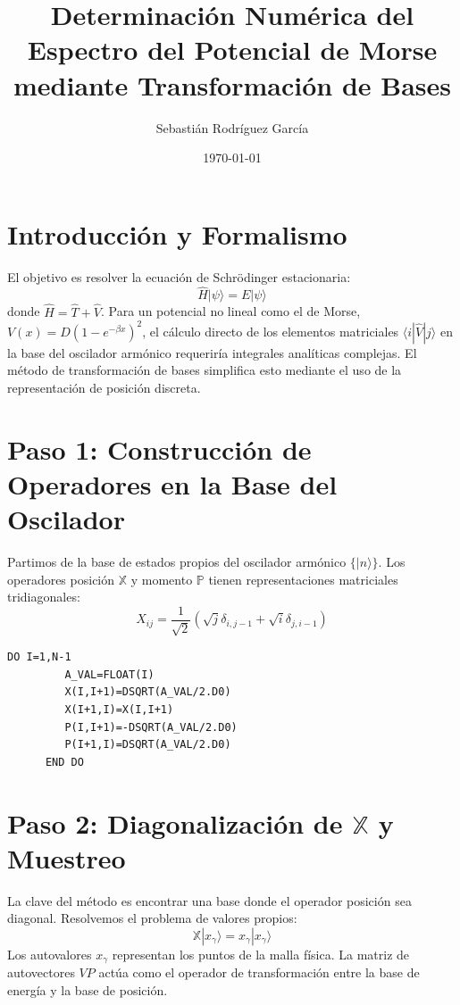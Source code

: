 \documentclass[12pt,a4paper]{article}
\title{Determinación Numérica del Espectro del Potencial de Morse mediante Transformación de Bases}
\author{Sebastián Rodríguez García}
\date{\today}
\begin{document}
\maketitle

\section{Introducción y Formalismo}
El objetivo es resolver la ecuación de Schrödinger estacionaria:
\begin{equation}
    \hat{H} |\psi\rangle = E |\psi\rangle
\end{equation}
donde $\hat{H} = \hat{T} + \hat{V}$. Para un potencial no lineal como el de Morse, $V(x) = D(1 - e^{-\beta x})^2$, el cálculo directo de los elementos matriciales $\langle i | \hat{V} | j \rangle$ en la base del oscilador armónico requeriría integrales analíticas complejas. El método de transformación de bases simplifica esto mediante el uso de la representación de posición discreta.

\section{Paso 1: Construcción de Operadores en la Base del Oscilador}
Partimos de la base de estados propios del oscilador armónico $\{|n\rangle\}$. Los operadores posición $\mathbb{X}$ y momento $\mathbb{P}$ tienen representaciones matriciales tridiagonales:
\begin{equation}
    X_{ij} = \frac{1}{\sqrt{2}}(\sqrt{j}\delta_{i,j-1} + \sqrt{i}\delta_{j,i-1})
\end{equation}

\begin{lstlisting}[caption=Inicialización de matrices en Fortran]
      DO I=1,N-1
         A_VAL=FLOAT(I)
         X(I,I+1)=DSQRT(A_VAL/2.D0)
         X(I+1,I)=X(I,I+1)
         P(I,I+1)=-DSQRT(A_VAL/2.D0)
         P(I+1,I)=DSQRT(A_VAL/2.D0)
      END DO
\end{lstlisting}

\section{Paso 2: Diagonalización de $\mathbb{X}$ y Muestreo}
La clave del método es encontrar una base donde el operador posición sea diagonal. Resolvemos el problema de valores propios:
\begin{equation}
    \mathbb{X} |x_\gamma\rangle = x_\gamma |x_\gamma\rangle
\end{equation}
Los autovalores $x_\gamma$ representan los puntos de la malla física. La matriz de autovectores $VP$ actúa como el operador de transformación entre la base de energía y la base de posición.
\end{document}
